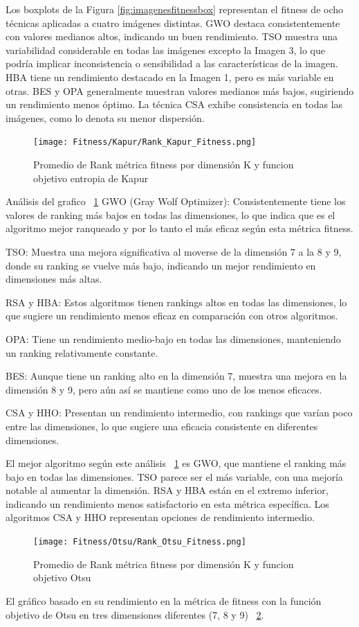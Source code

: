 \documentclass[conference]{IEEEtran}
\begin{document}
\noindent Los boxplots  de la Figura \ref{fig:imagenesfitnessbox} representan el fitness de ocho técnicas aplicadas a cuatro imágenes distintas. GWO destaca consistentemente con valores medianos altos, indicando un buen rendimiento. TSO muestra una variabilidad considerable en todas las imágenes excepto la Imagen 3, lo que podría implicar inconsistencia o sensibilidad a las características de la imagen. HBA tiene un rendimiento destacado en la Imagen 1, pero es más variable en otras. BES y OPA generalmente muestran valores medianos más bajos, sugiriendo un rendimiento menos óptimo. La técnica CSA exhibe consistencia en todas las imágenes, como lo denota su menor dispersión.

\begin{figure}[!htb]
	\centering
	\texttt{[image: Fitness/Kapur/Rank\_Kapur\_Fitness.png]}
	\caption{Promedio de Rank métrica fitness por dimensión K y funcion objetivo entropia de Kapur}
	\label{fig:Fitness_Kapur_Kank}
\end{figure}
\noindent Análisis del grafico ~\ref{fig:Fitness_Kapur_Kank}
\noindent GWO (Gray Wolf Optimizer): Consistentemente tiene los valores de ranking más bajos en todas las dimensiones, lo que indica que es el algoritmo mejor ranqueado y por lo tanto el más eficaz según esta métrica fitness.

\noindent TSO: Muestra una mejora significativa al moverse de la dimensión 7 a la 8 y 9, donde su ranking se vuelve más bajo, indicando un mejor rendimiento en dimensiones más altas.

\noindent RSA y HBA: Estos algoritmos tienen rankings altos en todas las dimensiones, lo que sugiere un rendimiento menos eficaz en comparación con otros algoritmos.

\noindent OPA: Tiene un rendimiento medio-bajo en todas las dimensiones, manteniendo un ranking relativamente constante.

\noindent BES: Aunque tiene un ranking alto en la dimensión 7, muestra una mejora en la dimensión 8 y 9, pero aún así se mantiene como uno de los menos eficaces.

\noindent CSA y HHO: Presentan un rendimiento intermedio, con rankings que varían poco entre las dimensiones, lo que sugiere una eficacia consistente en diferentes dimensiones.

\noindent El mejor algoritmo según este análisis ~\ref{fig:Fitness_Kapur_Kank} es GWO, que mantiene el ranking más bajo en todas las dimensiones. TSO parece ser el más variable, con una mejoría notable al aumentar la dimensión. RSA y HBA están en el extremo inferior, indicando un rendimiento menos satisfactorio en esta métrica específica. Los algoritmos CSA y HHO representan opciones de rendimiento intermedio.
\begin{figure}[!htb]
	\centering
	\texttt{[image: Fitness/Otsu/Rank\_Otsu\_Fitness.png]}
	\caption{Promedio de Rank métrica fitness por dimensión K y funcion objetivo Otsu}
	\label{fig:Fitness_Otsu_Kank}
\end{figure}
\noindent El gráfico basado en su rendimiento en la métrica de fitness con la función objetivo de Otsu en tres dimensiones diferentes (7, 8 y 9) ~\ref{fig:Fitness_Otsu_Kank}.
\end{document}
